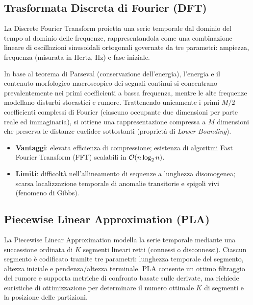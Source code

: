 \FloatBarrier
\subsection{Trasformata Discreta di Fourier (DFT)}
\label{subsec:ts-dft-approximation}

La Discrete Fourier Transform proietta una serie temporale dal dominio del tempo al dominio delle frequenze, rappresentandola come una combinazione lineare di oscillazioni sinusoidali ortogonali governate da tre parametri: ampiezza, frequenza (misurata in Hertz, Hz) e fase iniziale.

In base al teorema di Parseval (conservazione dell'energia), l'energia e il contenuto morfologico macroscopico dei segnali continui si concentrano prevalentemente nei primi coefficienti a bassa frequenza, mentre le alte frequenze modellano disturbi stocastici e rumore. Trattenendo unicamente i primi $M/2$ coefficienti complessi di Fourier (ciascuno occupante due dimensioni per parte reale ed immaginaria), si ottiene una rappresentazione compressa a $M$ dimensioni che preserva le distanze euclidee sottostanti (propriet\`a di \textit{Lower Bounding}).
\begin{itemize}
    \item \textbf{Vantaggi}: elevata efficienza di compressione; esistenza di algoritmi Fast Fourier Transform (FFT) scalabili in $\mathcal{O}\!\left(n \log_2 n\right)$.
    \item \textbf{Limiti}: difficolt\`a nell'allineamento di sequenze a lunghezza disomogenea; scarsa localizzazione temporale di anomalie transitorie e spigoli vivi (fenomeno di Gibbs).
\end{itemize}

\FloatBarrier
\subsection{Piecewise Linear Approximation (PLA)}
\label{subsec:ts-pla-approximation}

La Piecewise Linear Approximation modella la serie temporale mediante una successione ordinata di $K$ segmenti lineari retti (connessi o disconnessi). Ciascun segmento \`e codificato tramite tre parametri: lunghezza temporale del segmento, altezza iniziale e pendenza/altezza terminale. PLA consente un ottimo filtraggio del rumore e supporta metriche di confronto basate sulle derivate, ma richiede euristiche di ottimizzazione per determinare il numero ottimale $K$ di segmenti e la posizione delle partizioni.

